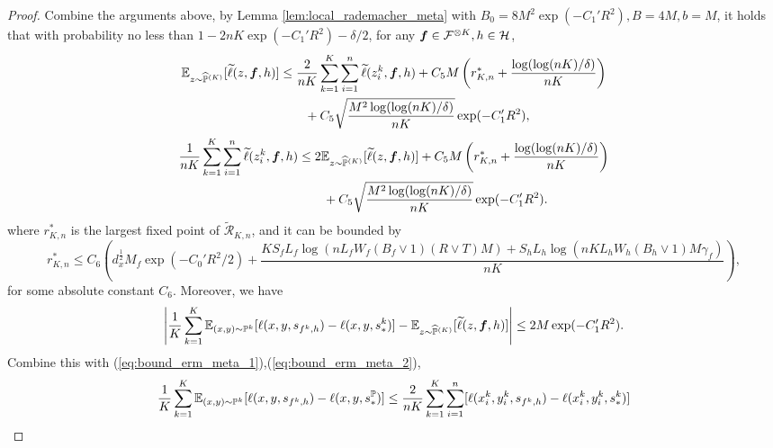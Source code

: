 \documentclass[11pt]{article}
\numberwithin{equation}{section}
\renewcommand{\P}{\mathbb{P}}
\renewcommand{\eqref}[1]{(\ref{#1})}
\begin{document}
\begin{proof}
    Combine the arguments above, by Lemma \ref{lem:local_rademacher_meta} with $B_0=8M^2\exp(-C_1'R^2),B=4M,b=M$, it holds that with probability no less than $1-2nK\exp(-C_1'R^2)-\delta/2$, for any ${\bm{f}}\in\mathcal{F}^{\otimes K},h\in\mathcal{H}$,
    \begin{equation}\label{eq:bound_erm_meta_1}
        \begin{aligned}
            \E_{z\sim\widehat{\P}^{(K)}} [\widetilde{\ell}(z,\vf,h)]
            &\leq \frac{2}{nK}\sum_{k=1}^K\sum_{i=1}^n \widetilde{\ell}(z_i^k,\vf,h) + C_5M\left(r_{K,n}^*+\frac{\log(\log(nK)/\delta)}{nK}\right) \\
            &\qquad + C_5\sqrt{\frac{M^2\log(\log(nK)/\delta)}{nK}}\exp(-C_1'R^2),
        \end{aligned}
    \end{equation}
    \begin{equation}\label{eq:bound_erm_meta_2}
        \begin{aligned}
            \frac{1}{nK}\sum_{k=1}^K\sum_{i=1}^n \widetilde{\ell}(z_i^k,\vf,h)
            &\leq 2\E_{z\sim\widehat{\P}^{(K)}} [\widetilde{\ell}(z,\vf,h)] + C_5M\left(r_{K,n}^*+\frac{\log(\log(nK)/\delta)}{nK}\right) \\
            &\qquad + C_5\sqrt{\frac{M^2\log(\log(nK)/\delta)}{nK}}\exp(-C_1'R^2).
        \end{aligned}
    \end{equation}
    where $r_{K,n}^*$ is the largest fixed point of $\widetilde{\mathcal{R}}_{K,n}$, and it can be bounded by
    \begin{equation}
        r_{K,n}^*\leq C_6\left(d_x^{\frac{1}{2}}M_f\exp(-C_0'R^2/2)+\frac{KS_fL_f\log\left(nL_fW_f(B_f\vee 1)(R\vee T)M\right)+S_hL_h\log\left(nKL_hW_h(B_h\vee 1)M\gamma_f\right)}{nK}\right),
    \end{equation}
    for some absolute constant $C_6$.
    Moreover, we have
    \begin{equation}
        \left|\frac{1}{K}\sum_{k=1}^K\E_{(x,y)\sim\P^k}[\ell(x,y,s_{f^k,h})-\ell(x,y,s_*^k)]
        - \E_{z\sim\widehat{\P}^{(K)}}[\widetilde{\ell}(z,\vf,h)] \right|\leq 2M\exp(-C_1'R^2).
    \end{equation}
    Combine this with \eqref{eq:bound_erm_meta_1},\eqref{eq:bound_erm_meta_2},
    \begin{equation}\label{eq:bound_erm_meta_3}
        \begin{aligned}
            \frac{1}{K}\sum_{k=1}^K\E_{(x,y)\sim\P^k} [\ell(x,y,s_{f^k,h})-\ell(x,y,s_*^\P)]
            &\leq \frac{2}{nK}\sum_{k=1}^K\sum_{i=1}^n [\ell(x_i^k,y_i^k,s_{f^k,h})-\ell(x_i^k,y_i^k,s_*^k)] \\

\end{aligned}
\end{equation}
\end{proof}
\end{document}
